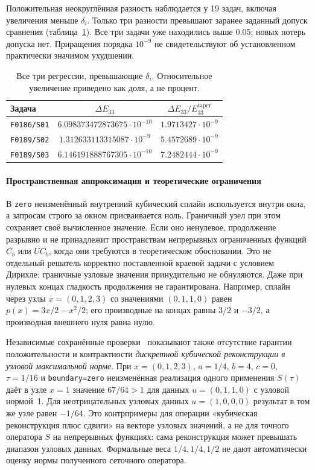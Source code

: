 \documentclass[14pt,a4paper]{extarticle}
\newcommand{\Sop}{S}
\DeclareRobustCommand{\code}[1]{\texttt{\let\savedunderscore\_\def\_{\savedunderscore\allowbreak}#1}}
\begin{document}
Положительная неокруглённая разность наблюдается у 19 задач, включая
увеличения меньше $\delta_i$. Только три разности превышают заранее
заданный допуск сравнения (таблица~\ref{tab:boundarydev-regressions}).
Все три задачи уже находились выше 0.05; новых потерь допуска нет.
Приращения порядка $10^{-9}$ не свидетельствуют об установленном
практически значимом ухудшении.

\begin{table}[!htbp]
\centering
\caption{Все три регрессии, превышающие $\delta_i$.
Относительное увеличение приведено как доля, а не процент.}
\label{tab:boundarydev-regressions}
\small
\begin{tabular}{lcc}
\toprule
Задача & $\Delta E_{33}$ & $\Delta E_{33}/E_{33}^{\mathrm{taper}}$\\
\midrule
\code{F0186/S01} & $6.098373472873675\cdot10^{-10}$ & $1.9713427\cdot10^{-9}$\\
\code{F0189/S02} & $1.312633113315087\cdot10^{-9}$ & $5.4572689\cdot10^{-9}$\\
\code{F0189/S03} & $6.146191888767305\cdot10^{-10}$ & $7.2482444\cdot10^{-9}$\\
\bottomrule
\end{tabular}
\end{table}

\paragraph{Пространственная аппроксимация и теоретические ограничения\\}
В \code{zero} неизменённый внутренний кубический сплайн используется
внутри окна, а запросам строго за окном присваивается ноль.
Граничный узел при этом сохраняет своё вычисленное значение. Если оно
ненулевое, продолжение разрывно и не принадлежит пространствам
непрерывных ограниченных функций $C_b$ или $UC_b$, когда они требуются
в теоретическом обосновании. Это не отдельный решатель корректно
поставленной краевой задачи с условием Дирихле: граничные узловые
значения принудительно не обнуляются. Даже при нулевых концах гладкость
продолжения не гарантирована. Например, сплайн через узлы
$x=(0,1,2,3)$ со значениями $(0,1,1,0)$ равен
$p(x)=3x/2-x^2/2$; его производные на концах равны $3/2$ и $-3/2$,
а производная внешнего нуля равна нулю.

Независимые сохранённые проверки~\cite{savedboundarydev} показывают
также отсутствие гарантии положительности и контрактности
\emph{дискретной кубической реконструкции в узловой максимальной норме}.
При $x=(0,1,2,3)$, $a=1/4$, $b=4$, $c=0$, $\tau=1/16$
и \code{boundary=zero} неизменённая реализация одного применения
$\Sop(\tau)$ даёт в узле $x=1$ значение $67/64>1$ для данных
$u=(0,1,1,0)$ с узловой нормой~1. Для неотрицательных узловых данных
$u=(1,0,0,0)$ результат в том же узле равен $-1/64$.
Это контрпримеры для операции «кубическая реконструкция плюс сдвиги»
на векторе узловых значений, а не для точного оператора $\Sop$ на
непрерывных функциях: сама реконструкция может превышать диапазон
узловых данных. Формальные веса $1/4,1/4,1/2$ не дают автоматически
оценку нормы полученного сеточного оператора.
\end{document}
